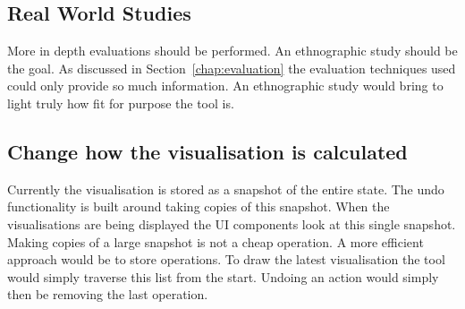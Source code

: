 
\subsection{Real World Studies}
More in depth evaluations should be performed.  An ethnographic study should be the goal.  As discussed in Section~\ref{chap:evaluation} the evaluation techniques used could only provide so much information.  An ethnographic study would bring to light truly how fit for purpose the tool is.

\subsection{Change how the visualisation is calculated}
Currently the visualisation is stored as a snapshot of the entire state.  The undo functionality is built around taking copies of this snapshot. When the visualisations are being displayed the \ac{UI} components look at this single snapshot.  Making copies of a large snapshot is not a cheap operation.  A more efficient approach would be to store operations.  To draw the latest visualisation the tool would simply traverse this list from the start.  Undoing an action would simply then be removing the last operation.
